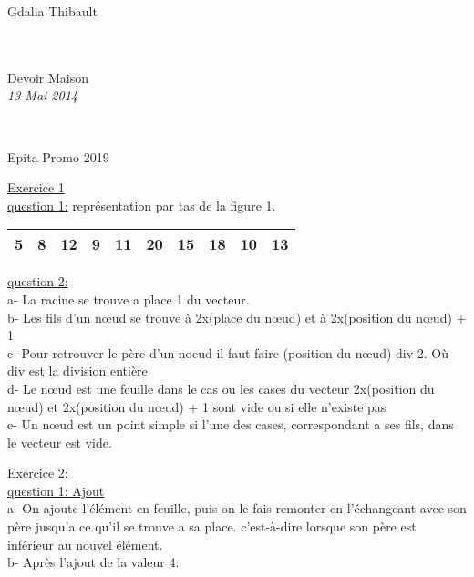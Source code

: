 \documentclass [11pt]{report}
\begin{document}
{\huge Gdalia Thibault}\\
\\
\vspace{20mm}\\
\begin{center}
{\Huge Devoir Maison}\\ {\LARGE \textit{13 Mai 2014}}\\
\end{center}
\vspace{110mm}\\
\begin{flushright}
Epita Promo 2019
\end{flushright}
\newpage
\underline{{\huge Exercice 1}}\\
\indent \underline{question 1:} \vspace{2.5mm}
	 repr\'esentation par tas de la figure 1.\\
\begin{tabular}{|c|c|c|c|c|c|c|c|c|c|}
\hline 5 & 8 & 12 & 9 & 11 & 20 & 15 & 18 & 10 & 13 \\ 
\hline 
\end{tabular} 

\vspace{5mm}

\indent \underline{question 2:}\\
a- La racine se trouve a place 1 du vecteur.\\
b- Les fils d'un nœud se trouve \`a 2x(place du nœud) et \`a 2x(position du nœud) + 1 \\
c- Pour retrouver le p\`ere d'un noeud il faut faire (position du nœud) div 2. O\`u div est la division enti\`ere\\
d- Le nœud est une feuille dans le cas ou les cases du vecteur 2x(position du nœud) et 2x(position du nœud) + 1 sont vide ou si elle n'existe pas\\
e- Un nœud est un point simple si l'une des cases, correspondant a ses fils, dans le vecteur est vide.\\

\vspace{10mm}

\underline{{\huge Exercice 2:}}\\
\indent \underline{question 1: Ajout}\\
\indent a- On ajoute l'\'el\'ement en feuille, puis on le fais remonter en l'\'echangeant avec son p\`ere jusqu'a ce qu'il se trouve a sa place. c'est-\`a-dire lorsque son p\`ere est inf\'erieur au nouvel \'el\'ement.\\
\indent b- Apr\`es l'ajout de la valeur 4:
\end{document}
